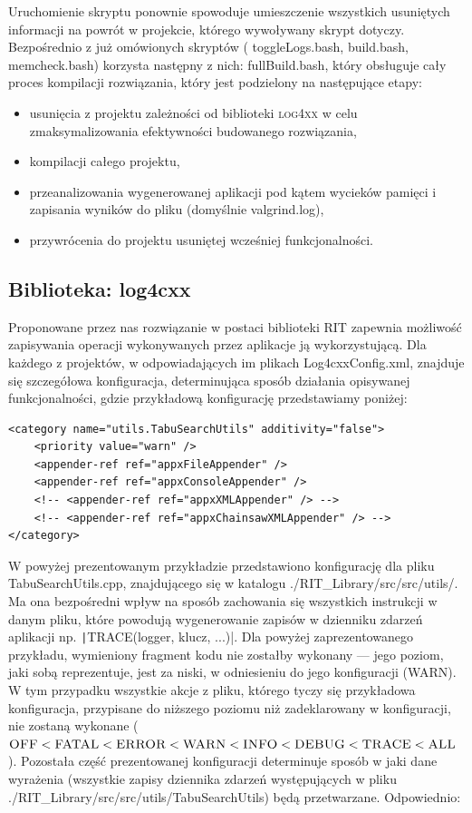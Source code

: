 Uruchomienie skryptu ponownie spowoduje umieszczenie wszystkich usuniętych informacji na powrót w projekcie, którego wywoływany skrypt dotyczy. Bezpośrednio z już omówionych skryptów ( \textsf{toggleLogs.bash}, \textsf{build.bash}, \textsf{memcheck.bash}) korzysta następny z nich: \textsf{fullBuild.bash}, który obsługuje cały proces kompilacji rozwiązania, który jest podzielony na następujące etapy:
\begin{itemize}
	\item usunięcia z projektu zależności od biblioteki \textsc{log4xx} w celu zmaksymalizowania efektywności budowanego rozwiązania,
	\item kompilacji całego projektu,
	\item przeanalizowania wygenerowanej aplikacji pod kątem wycieków pamięci i zapisania wyników do pliku (domyślnie \textsf{valgrind.log}),
	\item przywrócenia do projektu usuniętej wcześniej funkcjonalności.
\end{itemize}

\subsection{Biblioteka: log4cxx}

Proponowane przez nas rozwiązanie w postaci biblioteki RIT zapewnia możliwość zapisywania operacji wykonywanych przez aplikacje ją wykorzystującą. Dla każdego z projektów, w odpowiadających im plikach Log4cxxConfig.xml, znajduje się szczegółowa konfiguracja, determinująca sposób działania opisywanej funkcjonalności, gdzie przykładową konfigurację przedstawiamy poniżej:

\begin{verbatim}
<category name="utils.TabuSearchUtils" additivity="false">
	<priority value="warn" />
	<appender-ref ref="appxFileAppender" />
	<appender-ref ref="appxConsoleAppender" />
	<!-- <appender-ref ref="appxXMLAppender" /> -->
	<!-- <appender-ref ref="appxChainsawXMLAppender" /> -->
</category>
\end{verbatim}

W powyżej prezentowanym przykładzie przedstawiono konfigurację dla pliku \textsf{TabuSearchUtils.cpp}, znajdującego się w katalogu \textsf{./RIT\_Library/src/src/utils/}. Ma ona bezpośredni wpływ na sposób zachowania się wszystkich instrukcji w danym pliku, które powodują wygenerowanie zapisów w dzienniku zdarzeń aplikacji np. \texttt|TRACE(logger, klucz, ...)|. Dla powyżej zaprezentowanego przykładu, wymieniony fragment kodu nie zostałby wykonany --- jego poziom, jaki sobą reprezentuje, jest za niski, w odniesieniu do jego konfiguracji (\textsc{WARN}). W tym przypadku wszystkie akcje z pliku, którego tyczy się przykładowa konfiguracja, przypisane do niższego poziomu niż zadeklarowany w konfiguracji, nie zostaną wykonane ($\textsc{OFF} < \textsc{FATAL} < \textsc{ERROR} < \textsc{WARN} < \textsc{INFO} < \textsc{DEBUG} < \textsc{TRACE} < \textsc{ALL}$). Pozostała część prezentowanej konfiguracji determinuje sposób w jaki dane wyrażenia (wszystkie zapisy dziennika zdarzeń występujących w pliku \textsf{./RIT\_Library/src/src/utils/TabuSearchUtils}) będą przetwarzane. Odpowiednio:


